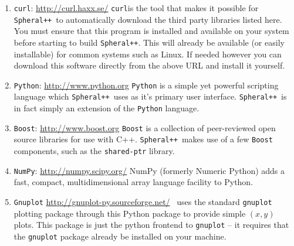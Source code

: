 \documentclass{article}
\newcommand{\Spheral}{{\tt Spheral++}}
\newcommand{\curl}{{\tt curl}}
\begin{document}
\begin{enumerate}
\item \curl: \url{http://curl.haxx.se/} \curl is the tool that makes it possible for \Spheral\ to automatically download the third party libraries listed here.  You must ensure that this program is installed and available on your system before starting to build \Spheral.  This will already be available (or easily installable) for common systems such as Linux.  If needed however you can download this software directly from the above URL and install it yourself.

\item \verb+Python+: \url{http://www.python.org} \label{python.item} \newline
\verb+Python+ is a simple yet powerful scripting language which \Spheral\ uses
as it's primary user interface.  \Spheral\ is in fact simply an extension of the
\verb+Python+ language.

\item \verb+Boost+: \url{http://www.boost.org} \label{boost.item} \newline
\verb+Boost+ is a collection of peer-reviewed open source libraries for use with
C++.  \Spheral\ makes use of a few \verb+Boost+ components, such as the
\verb+shared-ptr+ library.

\item \verb+NumPy+: \url{http://numpy.scipy.org/} \newline
NumPy (formerly Numeric Python) adds a fast, compact, multidimensional array
language facility to Python.

\item \verb+Gnuplot+ \label{gnuplot.item}
  \url{http://gnuplot-py.sourceforge.net/} \newline \Spheral\ uses the standard
  \verb+gnuplot+ plotting package through this Python package to provide simple
  $(x,y)$ plots.  This package is just the python frontend to \verb+gnuplot+ --
  it requires that the \verb+gnuplot+ package already be installed on your
  machine.



\end{enumerate}
\end{document}
